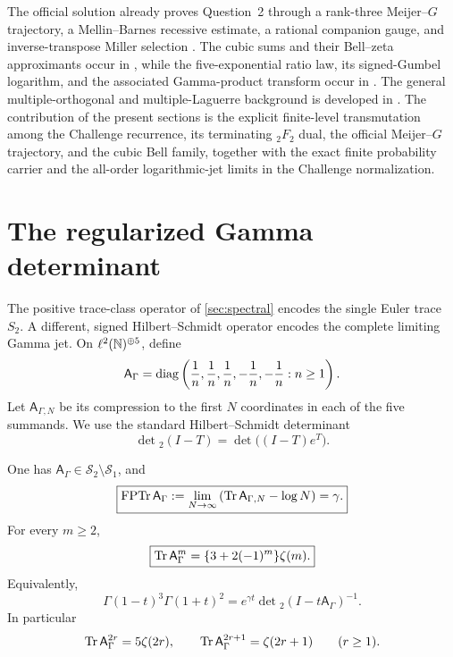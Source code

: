 \begin{remark}
The official solution already proves Question~2 through a rank-three
Meijer--\(G\) trajectory, a Mellin--Barnes recessive estimate, a rational
companion gauge, and inverse-transpose Miller selection
\cite{RamanujanOfficial2026}.  The cubic sums and their Bell--zeta
approximants occur in \cite{PilehroodBell2012,Pilehrood2013}, while the
five-exponential ratio law, its signed-Gumbel logarithm, and the associated
Gamma-product transform occur in \cite{Powers2023}.  The general
multiple-orthogonal and multiple-Laguerre background is developed in
\cite{VanAsscheWolfs2023,WolfsVanAssche2025}.  The contribution of the
present sections is the explicit finite-level transmutation among the
Challenge recurrence, its terminating \({}_2F_2\) dual, the official
Meijer--\(G\) trajectory, and the cubic Bell family, together with the exact
finite probability carrier and the all-order logarithmic-jet limits in the
Challenge normalization.
\end{remark}

\section{The regularized Gamma determinant}
\label{sec:gamma-determinant}

The positive trace-class operator of \cref{sec:spectral} encodes the single
Euler trace \(S_2\).  A different, signed Hilbert--Schmidt operator encodes
the complete limiting Gamma jet.  On
\(\ell^2(\mathbb N)^{\oplus5}\), define
\begin{equation}\label{eq:A-Gamma}
 \mathsf A_\Gamma=\operatorname{diag}\left(
 \frac1n,\frac1n,\frac1n,-\frac1n,-\frac1n:n\ge1\right).
\end{equation}
Let \(\mathsf A_{\Gamma,N}\) be its compression to the first \(N\)
coordinates in each of the five summands.  We use the standard
Hilbert--Schmidt determinant
\[
 \det{}_2(I-T)=\det\bigl((I-T)e^T\bigr).
\]

\begin{theorem}
\label{thm:gamma-det2}
One has
\(\mathsf A_\Gamma\in\mathcal S_2\setminus\mathcal S_1\), and
\begin{equation}\label{eq:FP-trace-gamma}
 \boxed{\displaystyle
 \operatorname{FPTr}\mathsf A_\Gamma
 :=\lim_{N\to\infty}
 \left(\operatorname{Tr}\mathsf A_{\Gamma,N}-\log N\right)=\gamma.}
\end{equation}
For every \(m\ge2\),
\begin{equation}\label{eq:Gamma-operator-traces}
 \boxed{\displaystyle
 \operatorname{Tr}\mathsf A_\Gamma^m
 =\{3+2(-1)^m\}\zeta(m).}
\end{equation}
Equivalently,
\begin{equation}\label{eq:Gamma-det2}
 \boxed{\displaystyle
 \Gamma(1-t)^3\Gamma(1+t)^2
 =e^{\gamma t}\det{}_2(I-t\mathsf A_\Gamma)^{-1}.}
\end{equation}
In particular
\begin{equation}\label{eq:Gamma-even-odd-traces}
 \operatorname{Tr}\mathsf A_\Gamma^{2r}=5\zeta(2r),\qquad
 \operatorname{Tr}\mathsf A_\Gamma^{2r+1}=\zeta(2r+1)\qquad(r\ge1).
\end{equation}
\end{theorem}

